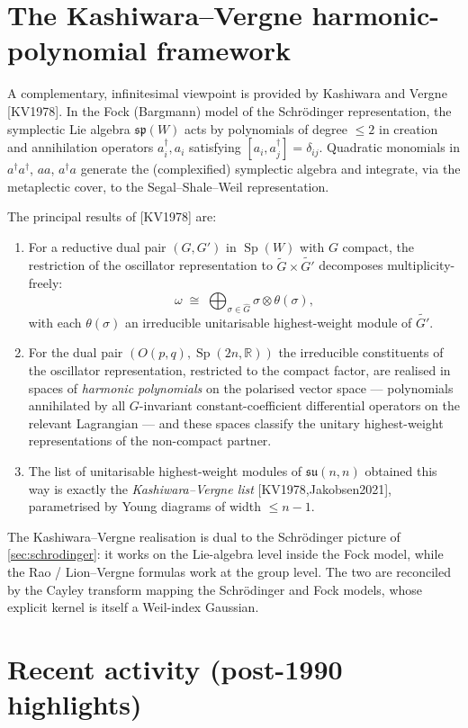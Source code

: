 \documentclass[11pt,letterpaper]{article}
\newcommand{\Sp}{\operatorname{Sp}}
\newcommand{\R}{\mathbb{R}}
\theoremstyle{plain}
\theoremstyle{definition}
\begin{document}
\section{The Kashiwara--Vergne harmonic-polynomial framework}
\label{sec:kv}

A complementary, infinitesimal viewpoint is provided by Kashiwara and Vergne [KV1978]. In the Fock (Bargmann) model of the Schr\"odinger representation, the symplectic Lie algebra $\mathfrak{sp}(W)$ acts by polynomials of degree $\le 2$ in creation and annihilation operators $a_i^\dagger,a_i$ satisfying $[a_i,a_j^\dagger] = \delta_{ij}$. Quadratic monomials in $a^\dagger a^\dagger$, $a a$, $a^\dagger a$ generate the (complexified) symplectic algebra and integrate, via the metaplectic cover, to the Segal--Shale--Weil representation.

The principal results of [KV1978] are:
\begin{enumerate}[leftmargin=2em,itemsep=2pt]
\item For a reductive dual pair $(G,G')$ in $\Sp(W)$ with $G$ compact, the restriction of the oscillator representation to $\widetilde G \times \widetilde{G'}$ decomposes multiplicity-freely:
\[
\omega \;\cong\; \bigoplus_{\sigma \in \widehat{G}}\sigma \otimes \theta(\sigma),
\]
with each $\theta(\sigma)$ an irreducible unitarisable highest-weight module of $\widetilde{G'}$.
\item For the dual pair $(O(p,q),\Sp(2n,\R))$ the irreducible constituents of the oscillator representation, restricted to the compact factor, are realised in spaces of \emph{harmonic polynomials} on the polarised vector space — polynomials annihilated by all $G$-invariant constant-coefficient differential operators on the relevant Lagrangian — and these spaces classify the unitary highest-weight representations of the non-compact partner.
\item The list of unitarisable highest-weight modules of $\mathfrak{su}(n,n)$ obtained this way is exactly the \emph{Kashiwara--Vergne list} [KV1978,Jakobsen2021], parametrised by Young diagrams of width $\le n-1$.
\end{enumerate}
The Kashiwara--Vergne realisation is dual to the Schr\"odinger picture of \cref{sec:schrodinger}: it works on the Lie-algebra level inside the Fock model, while the Rao / Lion--Vergne formulas work at the group level. The two are reconciled by the Cayley transform mapping the Schr\"odinger and Fock models, whose explicit kernel is itself a Weil-index Gaussian.

\section{Recent activity (post-1990 highlights)}
\label{sec:recent}
\end{document}
